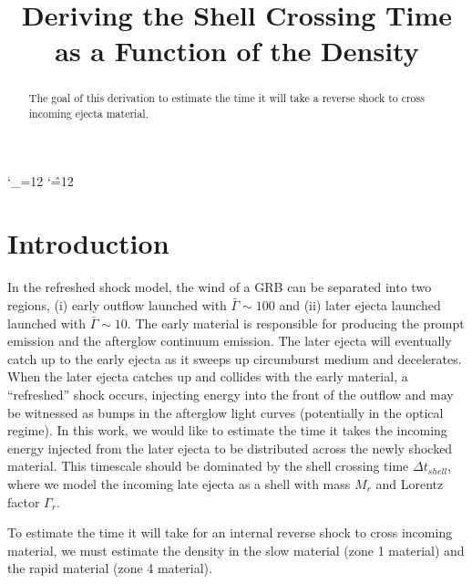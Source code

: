 \documentclass[linenumbers,twocolumn]{aastex631}
\def\upsubscripts{\catcode`\_=12 } \def\normalsubscripts{\catcode`\_=8 }
\def\upsupscripts{\catcode`\^=12 } \def\normalsupscripts{\catcode`\^=7 }
\begin{document}
\upsubscripts
\upsupscripts

\title{Deriving the Shell Crossing Time as a Function of the Density}


\begin{abstract}
The goal of this derivation to estimate the time it will take a reverse shock to cross incoming ejecta material.

\end{abstract}

\section{Introduction}
{
    In the refreshed shock model, the wind of a GRB can be separated into two regions, (i) early outflow launched with $\bar{\Gamma}\sim100$ and (ii) later ejecta launched launched with $\bar{\Gamma}\sim10$. The early material is responsible for producing the prompt emission and the afterglow continuum emission. The later ejecta will eventually catch up to the early ejecta as it sweeps up circumburst medium and decelerates. When the later ejecta catches up and collides with the early material, a ``refreshed'' shock occurs, injecting energy into the front of the outflow and may be witnessed as bumps in the afterglow light curves (potentially in the optical regime). In this work, we would like to estimate the time it takes the incoming energy injected from the later ejecta to be distributed across the newly shocked material. This timescale should be dominated by the shell crossing time $\Delta t_{shell}$, where we model the incoming late ejecta as a shell with mass $M_{r}$ and Lorentz factor $\Gamma_{r}$.


    To estimate the time it will take for an internal reverse shock to cross incoming material, we must estimate the density in the slow material (zone 1 material) and the rapid material (zone 4 material). 
}
\end{document}
